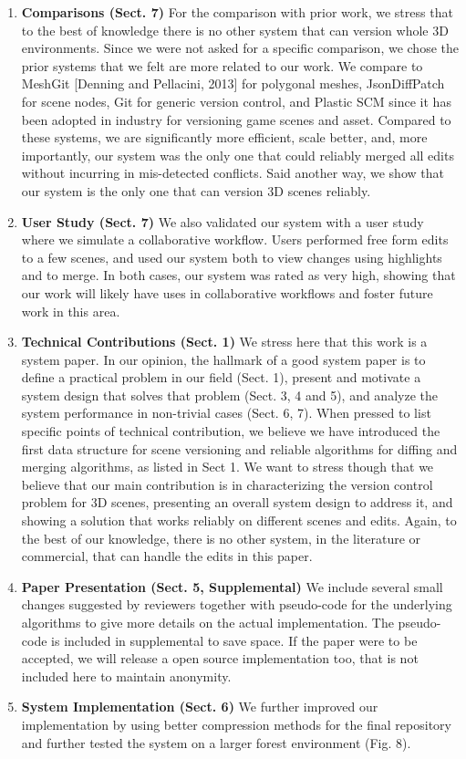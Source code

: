 \documentclass[acmlarge]{acmart}
\begin{document}
\begin{enumerate}

\item \textbf{Comparisons (Sect. 7)} 
For the comparison with prior work, we stress that to the best of knowledge 
there is no other system that can version whole 3D environments. Since we were 
not asked for a specific comparison, we chose the prior systems that we felt
are more related to our work. We compare to MeshGit [Denning and Pellacini, 2013]
for polygonal meshes, JsonDiffPatch for scene nodes, Git for generic version 
control, and Plastic SCM since it has been adopted in industry for versioning 
game scenes and asset. Compared to these systems, we are significantly more 
efficient, scale better, and, more importantly, our system was the only one that 
could reliably merged all edits without incurring in mis-detected conflicts.
Said another way, we show that our system is the only one that can version 3D 
scenes reliably.

\item \textbf{User Study (Sect. 7)}
We also validated our system with a user study where we simulate a collaborative 
workflow. Users performed free form edits to a few scenes, and used
our system both to view changes using highlights and to merge. In both cases,
our system was rated as very high, showing that our work will likely have 
uses in collaborative workflows and foster future work in this area.

\item \textbf{Technical Contributions (Sect. 1)}
We stress here that this work is a system paper. In our opinion, the hallmark 
of a good system paper is to define a practical problem in our field (Sect. 1), 
present and motivate a system design that solves that problem (Sect. 3, 4 and 5),
and analyze the system performance in non-trivial cases (Sect. 6, 7). When pressed 
to list specific points of technical contribution, we believe we have 
introduced the first data structure for scene versioning and reliable algorithms 
for diffing and merging algorithms, as listed in Sect 1. 
We want to stress though that we believe that our main contribution is in 
characterizing the version control problem for 3D scenes, presenting an overall 
system design to address it, and showing a solution that works reliably 
on different scenes and edits.
Again, to the best of our knowledge, there is no other system, in the literature
or commercial, that can handle the edits in this paper.

\item \textbf{Paper Presentation (Sect. 5, Supplemental)}
We include several small changes suggested by reviewers together with 
pseudo-code for the underlying algorithms to give more details on the actual 
implementation. The pseudo-code is included in supplemental to save space. 
If the paper were to be accepted, we will release a open source
implementation too, that is not included here to maintain anonymity.

\item \textbf{System Implementation (Sect. 6)}
We further improved our implementation by using better compression methods
for the final repository and further tested the system on a larger forest
environment (Fig. 8).

\end{enumerate}
\end{document}
